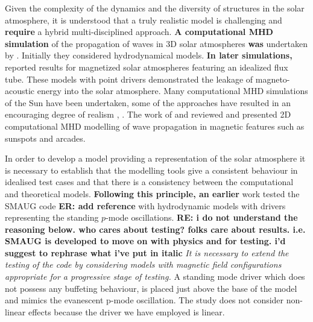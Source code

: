 \documentclass[physics,article,submit,pdftex,moreauthors]{Definitions/mdpi}
\begin{document}
Given the complexity of the dynamics and the diversity of structures in the solar atmosphere, it is understood that a truly realistic model is challenging and {\bf require} a hybrid multi-disciplined approach. {\bf A computational MHD simulation} of the propagation of waves in 3D solar atmospheres {\bf was} undertaken by \citet{Fedun2009a}. Initially they considered hydrodynamical models. {\bf In later simulations, }
\citet{Fedun2009b} \citet{Vigeesh2012} reported results for magnetized solar atmospheres featuring an idealized flux tube. These models with point drivers demonstrated the leakage of magneto-acoustic energy into the solar atmosphere. Many computational MHD simulations of the Sun have been undertaken, some of the approaches have resulted in an encouraging degree of realism  \citet{Vogler2005}, \citet{Gudiksen2011}.  The work of \citet{Khomenko2013} and  \citet{Santamaria2015} reviewed and presented 2D computational MHD modelling of wave propagation in magnetic features such as sunspots and arcades.

In order to develop a model providing a representation of the solar atmosphere it is necessary to establish that the modelling tools give a consistent behaviour in idealised test cases and that there is a consistency between the computational and theoretical models. {\bf Following this principle, an earlier} work tested the SMAUG code {\bf ER: add reference} with hydrodynamic models with drivers representing the standing $p$-mode oscillations. 
{\bf RE: i do not understand the reasoning below. who cares about testing? folks care about results. i.e. SMAUG is developed to move on with physics and for testing. i'd suggest to rephrase what i've put in italic}
{\it It is necessary to extend the testing of the code by considering models with magnetic field configurations appropriate for a progressive stage of testing.} A standing mode driver which does not possess any buffeting behaviour, is placed just above the base of the model and mimics the evanescent p-mode oscillation. The study does not consider non-linear effects because the driver we have employed is linear.



\end{document}
